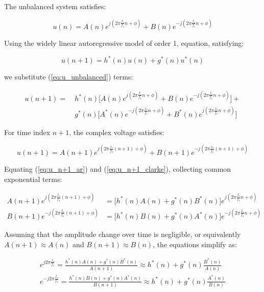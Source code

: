 \documentclass[12pt]{article}
\begin{document}
			The unbalanced system satisfies:
			
			\begin{equation}
			u(n) = A(n) e^{j(2\pi \frac{f_{o}}{f_{s}} n + \phi)} + B(n) e^{-j(2\pi \frac{f_{o}}{f_{s}} n + \phi)}
			\label{eq:u_unbalanced}
			\end{equation}
			
			Using the widely linear autoregressive model of order 1, equation, satisfying:
			
			\begin{equation}
			u(n+1) = h^{*}(n) u(n) + g^{*}(n) u^{*}(n)
			\end{equation}
			
			we substitute (\ref{eq:u_unbalanced}) terms:
			
			\begin{align}
			u(n+1) =\ 
			&h^{*}(n) \bigg[ A(n) e^{j(2\pi \frac{f_{o}}{f_{s}} n + \phi)} + B(n) e^{-j(2\pi \frac{f_{o}}{f_{s}} n + \phi)} \bigg] + \nonumber\\
			&g^{*}(n) \bigg[ A^{*}(n) e^{-j(2\pi \frac{f_{o}}{f_{s}} n + \phi)} + B^{*}(n) e^{j(2\pi \frac{f_{o}}{f_{s}} n + \phi)} \bigg]
			\label{eq:u_n+1_ar}
			\end{align}
			
			For time index $n+1$, the complex voltage satisfies:
			
			\begin{equation}
			u(n+1) = A(n+1) e^{j(2\pi \frac{f_{o}}{f_{s}} (n+1) + \phi)} + B(n+1) e^{-j(2\pi \frac{f_{o}}{f_{s}} (n+1) + \phi)}
			\label{eq:u_n+1_clarke}
			\end{equation}
			
			Equating (\ref{eq:u_n+1_ar}) and (\ref{eq:u_n+1_clarke}), collecting common exponential terms:
			
			\begin{align}
			A(n+1) e^{j(2\pi \frac{f_{o}}{f_{s}} (n+1) + \phi)} &= \bigg[ h^{*}(n) A(n) + g^{*}(n) B^{*}(n) \bigg] e^{j(2\pi \frac{f_{o}}{f_{s}} n + \phi)} \\
			B(n+1) e^{-j(2\pi \frac{f_{o}}{f_{s}} (n+1) + \phi)} &= \bigg[ h^{*}(n) B(n) + g^{*}(n) A^{*}(n) \bigg] e^{-j(2\pi \frac{f_{o}}{f_{s}} n + \phi)}
			\end{align}
			
			Assuming that the amplitude change over time is negligible, or equivalently $A(n+1) \approx A(n)$ and $B(n+1) \approx B(n)$, the equations simplify as:
			
			\begin{align}
			e^{j 2\pi \frac{f_{o}}{f_{s}}} = \frac{h^{*}(n) A(n) + g^{*}(n) B^{*}(n)}{A(n+1)} \approx h^{*}(n) + g^{*}(n) \frac{B^{*}(n)}{A(n)} \label{eq:e_A}\\
			e^{-j 2\pi \frac{f_{o}}{f_{s}}} = \frac{h^{*}(n) B(n) + g^{*}(n) A^{*}(n)}{B(n+1)} \approx h^{*}(n) + g^{*}(n) \frac{A^{*}(n)}{B(n)} \label{eq:e_B}
			\end{align}
			
\end{document}
